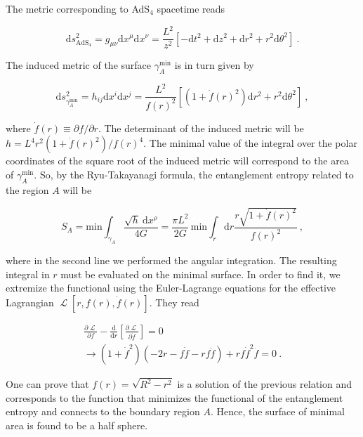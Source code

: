 \documentclass[twocolumn]{revtex4}
\providecommand{\eq}[2]{
    \begin{equation}
        #2
    \label{eq:#1}
    \end{equation}
}
\providecommand{\eqgat}[2]{
    \begin{gather}
        #2
    \label{eq:#1}
    \end{gather}
}
\DeclareMathOperator{\calL}{\mathcal{L}}
\begin{document}
The metric corresponding to AdS$_4$ spacetime reads
\eq{1Ametric}{
    \mathrm{d}s^2_{\text{AdS}_4} = g_{\mu \nu} \mathrm{d}x^\mu \mathrm{d}x^\nu = 
    \frac{L^2}{z^2} [ -\mathrm{d}t^2 + \mathrm{d}z^2 + \mathrm{d}r^2 + r^2 \mathrm{d}\theta^2 ] \ . \nonumber
}
The induced metric of the surface $\gamma_A^\text{min}$ is in turn given by
\eq{1gammaAmetric}{
    \mathrm{d}s^2_{\gamma_A^\text{min}} = h_{i j} \mathrm{d}x^i \mathrm{d}x^j = 
    \frac{L^2}{f(r)^2} \left[ \left( 1+ \dot{f}(r)^2 \right) \mathrm{d}r^2 + r^2 \mathrm{d}\theta^2 \right] \ , \nonumber
}
where $ \dot{f}(r) \equiv \partial f/\partial r$. The determinant of the induced metric will be
$
    h = L^4 r^2 ( 1 + \dot{f}(r)^2 )/f(r)^4 
$.  
The minimal value of the integral over the polar coordinates of the square root of the induced metric will correspond to the area of $\gamma_A^\text{min}$. So, by the Ryu-Takayanagi formula, the entanglement entropy related to the region $A$ will be
\eq{1EEA}{
    S_A = \text{min} \int_{\gamma_A}    \frac{\sqrt{h} \ \mathrm{d}x^\rho}{4G} = \frac{\pi L^2}{2G} \, \text{min} \int_r \mathrm{d}r \frac{r \sqrt{ 1 + \dot{f}(r)^2 }}{f(r)^2}  \ ,\nonumber
}
where in the second line we performed the angular integration. The resulting integral in $r$ must be evaluated on the minimal surface. In order to find it, we extremize the functional using the 
Euler-Lagrange equations for the effective Lagrangian $\calL [r,f(r),\dot{f}(r)]$. They read
\eqgat{1EL}{
    \frac{\partial \calL}{\partial f} - \frac{\mathrm{d}}{\mathrm{d}r} \left[ \frac{\partial \calL}{\partial \dot{f}} \right] = 0 \nonumber \\
    \longrightarrow \left( 1+\dot{f}^2 \right) \left( -2r-f\dot{f}-rf\ddot{f} \right) + rf\dot{f}^2\ddot{f} = 0 \ .\nonumber
}
One can prove that $f(r) = \sqrt{R^2 - r^2}$ is a solution of the previous relation and corresponds to the function that minimizes the functional of the entanglement entropy and connects to the boundary region $A$. Hence, the surface of minimal area is found to be a half sphere.
\end{document}

